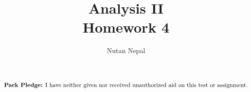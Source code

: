 \documentclass[12pt]{article}
\title{Analysis II \\
\large Homework 4
}
\author{Nutan Nepal}
\newcommand{\packpledge}{
    $\text{{\bf Pack Pledge:} I have neither given nor
    received unauthorized aid on this
    test or assignment.}$}
\begin{document}
\maketitle
\packpledge\\
\makebox[\linewidth]{\rule{200mm}{1pt}}
\vspace{1mm}


\newcommand{\mR}{\mathbb{R}}
\newcommand{\mM}{\mathcal{M}}
\newcommand{\mN}{\mathbb{N}}
\newcommand{\mC}{\mathbb{C}}
\newcommand{\mQ}{\mathbb{Q}}
\newcommand{\cP}{\mathcal{P}}
\newcommand{\cB}{\mathcal{B}}
\newcommand{\cM}{\mathcal{M}}
\newcommand{\ds}{\displaystyle}
\newcommand{\al}{\alpha}
\newcommand{\li}{l^{\infty}}
\newcommand{\ep}{\varepsilon}
\newcommand{\de}{\delta}
\newcommand{\T}{\mathcal{T}}
\newcommand{\linf}{l^{\infty}}
\newcommand{\cD}{\mathcal{D}}
\newcommand{\cR}{\mathcal{R}}
\newcommand{\cN}{\mathcal{N}}
\newcommand{\lsn}{\limsup_{n \to \infty}}
\newcommand{\lin}{\liminf_{n \to \infty}}
\newcommand{\dmu}{\ d\mu}
\newcommand{\ix}{\int_X}
\newcommand{\cL}{\mathcal{L}(\mathbb{R})}
\newcommand{\soi}{\sum_{i=1}^{\infty}}
\newcommand{\son}{\sum_{i=1}^{n}}
\newcommand{\la}{\lambda}
\newcommand{\Lp}{L^p(\mu)}
\newcommand{\Lq}{L^q(\mu)}
\newcommand{\Lr}{L^r(\mu)}
\newcommand{\ms}{(X, \mM, \mu)}
\newcommand{\outm}{\mu^*}
\end{document}
